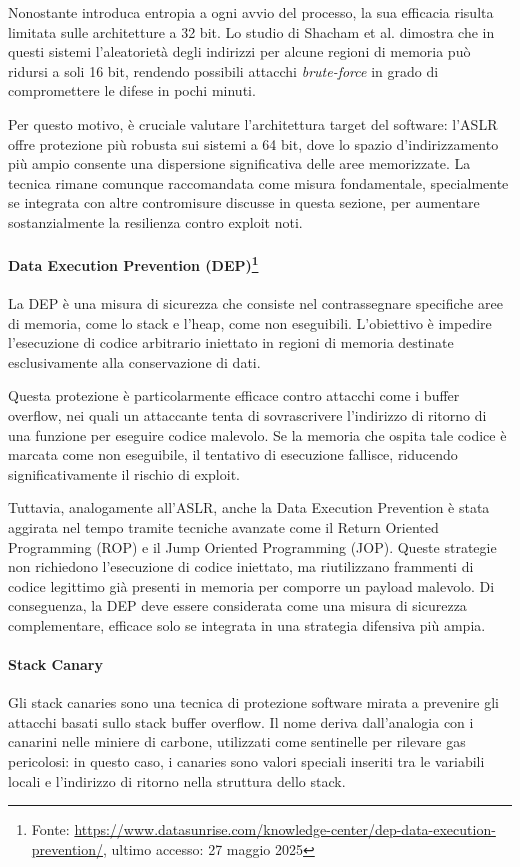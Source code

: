 Nonostante introduca entropia a ogni avvio del processo, la sua efficacia risulta
limitata sulle architetture a 32 bit. Lo studio di Shacham et al.\cite{aslr_effectiveness}
dimostra che in questi sistemi l'aleatorietà degli indirizzi per alcune regioni
di memoria può ridursi a soli 16 bit, rendendo possibili attacchi \textit{brute-force}
in grado di compromettere le difese in pochi minuti.

Per questo motivo, è cruciale valutare l'architettura target del software: l'ASLR
offre protezione più robusta sui sistemi a 64 bit, dove lo spazio d'indirizzamento
più ampio consente una dispersione significativa delle aree memorizzate. La
tecnica rimane comunque raccomandata come misura fondamentale, specialmente se integrata
con altre contromisure discusse in questa sezione, per aumentare sostanzialmente
la resilienza contro exploit noti.

\paragraph{Data Execution Prevention (DEP)\protect\footnote{Fonte: \url{https://www.datasunrise.com/knowledge-center/dep-data-execution-prevention/},
ultimo accesso: 27 maggio 2025}}
La DEP è una misura di sicurezza che consiste nel contrassegnare specifiche aree
di memoria, come lo stack e l'heap, come non eseguibili. L'obiettivo è impedire
l'esecuzione di codice arbitrario iniettato in regioni di memoria destinate
esclusivamente alla conservazione di dati.

Questa protezione è particolarmente efficace contro attacchi come i buffer
overflow, nei quali un attaccante tenta di sovrascrivere l'indirizzo di ritorno di
una funzione per eseguire codice malevolo. Se la memoria che ospita tale codice
è marcata come non eseguibile, il tentativo di esecuzione fallisce, riducendo
significativamente il rischio di exploit.

Tuttavia, analogamente all'ASLR, anche la Data Execution Prevention è stata
aggirata nel tempo tramite tecniche avanzate come il Return Oriented Programming
(ROP) e il Jump Oriented Programming (JOP). Queste strategie non richiedono l'esecuzione
di codice iniettato, ma riutilizzano frammenti di codice legittimo già presenti
in memoria per comporre un payload malevolo. Di conseguenza, la DEP deve essere
considerata come una misura di sicurezza complementare, efficace solo se integrata
in una strategia difensiva più ampia.

\paragraph{Stack Canary}
Gli stack canaries sono una tecnica di protezione software mirata a prevenire
gli attacchi basati sullo stack buffer overflow. Il nome deriva dall'analogia con
i canarini nelle miniere di carbone, utilizzati come sentinelle per rilevare gas
pericolosi: in questo caso, i canaries sono valori speciali inseriti tra le
variabili locali e l'indirizzo di ritorno nella struttura dello stack.

